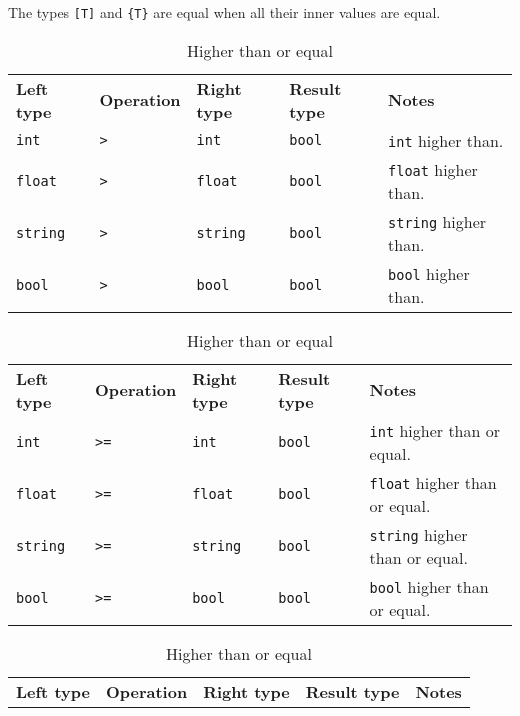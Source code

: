 The types \texttt{[T]} and \texttt{\{T\}} are equal when all their inner values are equal.

\begin{table}[H]
    \centering
    \begin{subtable}{\textwidth}
        \centering
        \begin{tabular}{ l l l l p{9.5cm} }
            \textbf{Left type} & \textbf{Operation} & \textbf{Right type} & \textbf{Result type} & \textbf{Notes} \\
            \texttt{int} & \texttt{>} & \texttt{int} & \texttt{bool} & \texttt{int} higher than.\\
            \texttt{float} & \texttt{>} & \texttt{float} & \texttt{bool} & \texttt{float} higher than.\\
            \texttt{string} & \texttt{>} & \texttt{string} & \texttt{bool} & \texttt{string} higher than.\\
            \texttt{bool} & \texttt{>} & \texttt{bool} & \texttt{bool} & \texttt{bool} higher than.\\
        \end{tabular}
        \caption{Higher than}
    \end{subtable}
    \begin{subtable}{\textwidth}
        \centering
        \begin{tabular}{ l l l l p{9.5cm} }
            \textbf{Left type} & \textbf{Operation} & \textbf{Right type} & \textbf{Result type} & \textbf{Notes} \\
            \texttt{int} & \texttt{>=} & \texttt{int} & \texttt{bool} & \texttt{int} higher than or equal.\\
            \texttt{float} & \texttt{>=} & \texttt{float} & \texttt{bool} & \texttt{float} higher than or equal.\\
            \texttt{string} & \texttt{>=} & \texttt{string} & \texttt{bool} & \texttt{string} higher than or equal.\\
            \texttt{bool} & \texttt{>=} & \texttt{bool} & \texttt{bool} & \texttt{bool} higher than or equal.\\
        \end{tabular}
        \caption{Higher than or equal}
    \end{subtable}
    \begin{subtable}{\textwidth}
        \centering
        \begin{tabular}{ l l l l p{9.5cm} }
            \textbf{Left type} & \textbf{Operation} & \textbf{Right type} & \textbf{Result type} & \textbf{Notes} \\

\end{tabular}
\end{subtable}
\end{table}
